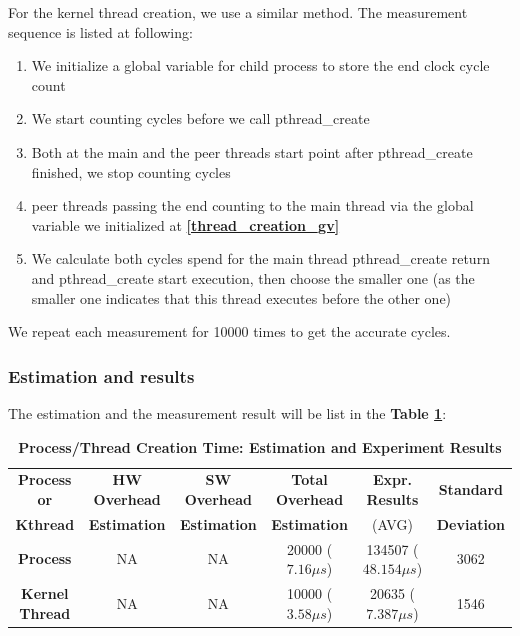 For the kernel thread creation, we use a similar method. The measurement sequence is listed at following:
\begin{enumerate}
    \item We initialize a global variable for child process to store the end clock cycle count \label{thread_creation_gv}
    \item We start counting cycles before we call pthread\_create
    \item Both at the main and the peer threads start point after pthread\_create finished, we stop counting cycles
    \item peer threads passing the end counting to the main thread via the global variable we initialized at \textbf{\ref{thread_creation_gv}}
    \item We calculate both cycles spend for the main thread pthread\_create return and pthread\_create start execution, then choose the smaller one (as the smaller one indicates that this thread executes before the other one)
\end{enumerate}

We repeat each measurement for 10000 times to get the accurate cycles.

\subsubsection{Estimation and results}

The estimation and the measurement result will be list in the \textbf{Table \ref{process_creation_time}}:

\begin{table}[ht]
  \centering
  \caption{\textbf{Process/Thread Creation Time: Estimation and Experiment Results}}
  \hspace*{-2em}\begin{threeparttable}
  \begin{tabular}{cccccc}
  \hline
      \textbf{Process or} & \textbf{HW Overhead} & \textbf{SW Overhead } & \textbf{Total Overhead} & \textbf{Expr. Results} & \textbf{Standard}\\
      \textbf{Kthread} & \textbf{Estimation}       &  \textbf{Estimation}         & \textbf{Estimation}  & (AVG)   & \textbf{Deviation} \\
  \hline
      \textbf{Process} & NA & NA & 20000 ($7.16 \mu s$) & 134507 ($48.154 \mu s$) & 3062 \\
      \textbf{Kernel Thread} & NA & NA & 10000 ($3.58 \mu s$) & 20635 ($7.387 \mu s$)  & 1546 \\
  \hline
  \end{tabular}
  \end{threeparttable}
  \label{process_creation_time}
\end{table}

